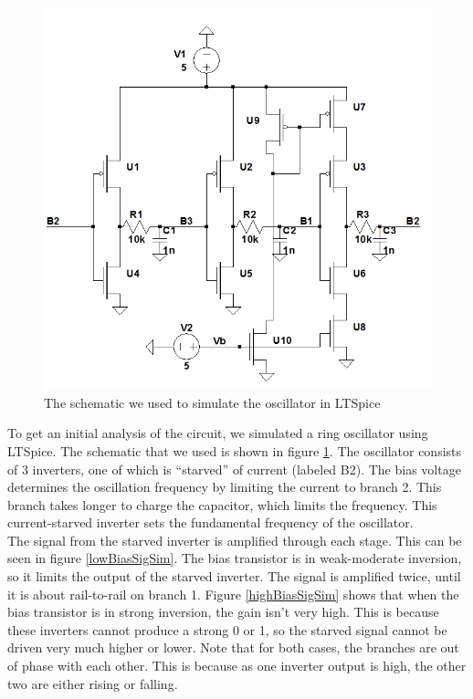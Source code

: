 \documentclass{article}
\begin{document}
\begin{figure}[H]
\centering
\includegraphics[scale=.5]{finalSchem2.png}
\caption{The schematic we used to simulate the oscillator in LTSpice}
\label{schem}
\end{figure}

To get an initial analysis of the circuit, we simulated a ring oscillator using LTSpice. The schematic that we used is shown in figure \ref{schem}. The oscillator consists of 3 inverters, one of which is ``starved'' of current (labeled B2). The bias voltage determines the oscillation frequency by limiting the current to branch 2. This branch takes longer to charge the capacitor, which limits the frequency. This current-starved inverter sets the fundamental frequency of the oscillator. \\

The signal from the starved inverter is amplified through each stage. This can be seen in figure \ref{lowBiasSigSim}. The bias transistor is in weak-moderate inversion, so it limits the output of the starved inverter. The signal is amplified twice, until it is about rail-to-rail on branch 1. Figure \ref{highBiasSigSim} shows that when the bias transistor is in strong inversion, the gain isn't very high. This is because these inverters cannot produce a strong 0 or 1, so the starved signal cannot be driven very much higher or lower. Note that for both cases, the branches are out of phase with each other. This is because as one inverter output is high, the other two are either rising or falling. \\
\end{document}
